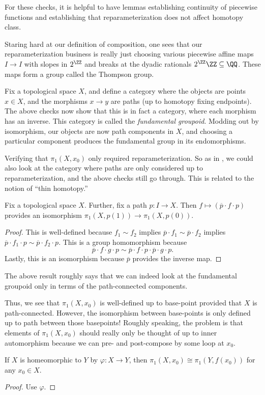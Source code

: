 \documentclass[../notes.tex]{subfiles}
\begin{document}
For these checks, it is helpful to have lemmas establishing continuity of piecewise functions and establishing that reparameterization does not affect homotopy class.
\begin{remark}
	Staring hard at our definition of composition, one sees that our reparameterization business is really just choosing various piecewise affine maps $I\to I$ with slopes in $2^\ZZ$ and breaks at the dyadic rationals $2^\ZZ\ZZ\subseteq\QQ$. These maps form a group called the Thompson group.
\end{remark}
\begin{remark} \label{rem:fund-groupoid} 
	Fix a topological space $X$, and define a category where the objects are points $x\in X$, and the morphisms $x\to y$ are paths (up to homotopy fixing endpoints). The above checks now show that this is in fact a category, where each morphism has an inverse. This category is called the \textit{fundamental groupoid}. Modding out by isomorphism, our objects are now path components in $X$, and choosing a particular component produces the fundamental group in its endomorphisms.
\end{remark}
\begin{remark}
	Verifying that $\pi_1(X,x_0)$ only required reparameterization. So as in , we could also look at the category where paths are only considered up to reparameterization, and the above checks still go through. This is related to the notion of ``thin homotopy.''
\end{remark}
\begin{lemma}
	Fix a topological space $X$. Further, fix a path $p\colon I\to X$. Then $f\mapsto(\overline p\cdot f\cdot p)$ provides an isomorphism $\pi_1(X,p(1))\to\pi_1(X,p(0))$.
\end{lemma}
\begin{proof}
	This is well-defined because $f_1\sim f_2$ implies $\overline p\cdot f_1\sim\overline p\cdot f_2$ implies $\overline p\cdot f_1\cdot p\sim\overline p\cdot f_2\cdot p$. This is a group homomorphism because
	\[\overline p\cdot f\cdot g\cdot p\sim\overline p\cdot f\cdot p\cdot\overline p\cdot g\cdot p.\]
	Lastly, this is an isomorphism because $\overline p$ provides the inverse map.
\end{proof}
\begin{remark}
	The above result roughly says that we can indeed look at the fundamental groupoid only in terms of the path-connected components.
\end{remark}
Thus, we see that $\pi_1(X,x_0)$ is well-defined up to base-point provided that $X$ is path-connected. However, the isomorphism between base-points is only defined up to path between those basepoints! Roughly speaking, the problem is that elements of $\pi_1(X,x_0)$ should really only be thought of up to inner automorphism because we can pre- and post-compose by some loop at $x_0$.
\begin{lemma}
	If $X$ is homeomorphic to $Y$ by $\varphi\colon X\to Y$, then $\pi_1(X,x_0)\cong\pi_1(Y,f(x_0))$ for any $x_0\in X$.
\end{lemma}
\begin{proof}
	Use $\varphi$.
\end{proof}
\end{document}
